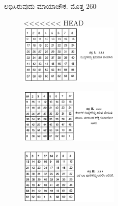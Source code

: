\begin{figure}[H]
\begin{figure}[H]
\begin{figure}[h]
\begin{itemize}
	ಲಭಿಸಿರುವುದು ಮಾಯಾಚೌಕ. ಮೊತ್ತ 260
	\begin{figure}[H]
<<<<<<< HEAD
	\includegraphics[scale=1.18]{src/figures/chap3/fig3-20.jpg}
	\end{figure}
	\begin{figure}[H]
	\includegraphics[scale=.92]{src/figures/chap3/fig3-21.jpg}
	\end{figure}
	\begin{figure}[H]
	\includegraphics[scale=.92]{src/figures/chap3/fig3-22.jpg}

\end{figure}
\end{itemize}
\end{figure}
\end{figure}
\end{figure}
